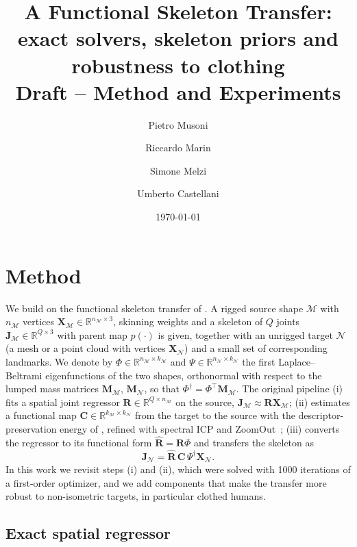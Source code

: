 \documentclass[11pt]{article}
\title{A Functional Skeleton Transfer: exact solvers, skeleton priors and robustness to clothing\\[0.3em]
\large Draft -- Method and Experiments}
\author{Pietro Musoni \and Riccardo Marin \and Simone Melzi \and Umberto Castellani}
\date{\today}
\newcommand{\M}{\mathcal{M}}
\newcommand{\N}{\mathcal{N}}
\newcommand{\R}{\mathbb{R}}
\newcommand{\Rspat}{\mathbf{R}}
\newcommand{\Rhat}{\widehat{\mathbf{R}}}
\newcommand{\X}{\mathbf{X}}
\newcommand{\J}{\mathbf{J}}
\newcommand{\C}{\mathbf{C}}
\begin{document}
\maketitle

\section{Method}
\label{sec:method}

We build on the functional skeleton transfer of \citet{musoni2021functional}.
A rigged source shape $\M$ with $n_\M$ vertices $\X_\M \in \R^{n_\M \times 3}$,
skinning weights and a skeleton of $Q$ joints $\J_\M \in \R^{Q \times 3}$ with
parent map $p(\cdot)$ is given, together with an unrigged target $\N$ (a mesh or
a point cloud with vertices $\X_\N$) and a small set of corresponding landmarks.
We denote by $\Phi \in \R^{n_\M \times k_\M}$ and $\Psi \in \R^{n_\N \times k_\N}$
the first Laplace--Beltrami eigenfunctions of the two shapes, orthonormal with
respect to the lumped mass matrices $\mathbf{M}_\M$, $\mathbf{M}_\N$, so that
$\Phi^\dagger = \Phi^\top \mathbf{M}_\M$. The original pipeline
(i) fits a spatial joint regressor $\Rspat \in \R^{Q \times n_\M}$ on the
source, $\J_\M \approx \Rspat \X_\M$; (ii) estimates a functional map
$\C \in \R^{k_\M \times k_\N}$ from the target to the source with the
descriptor-preservation energy of \citet{nogneng2017informative}, refined with
spectral ICP and ZoomOut~\citep{melzi2019zoomout}; (iii) converts the regressor
to its functional form $\Rhat = \Rspat \Phi$ and transfers the skeleton as
\begin{equation}
  \J_\N = \Rhat \, \C \, \Psi^\dagger \X_\N .
  \label{eq:transfer}
\end{equation}
In this work we revisit steps (i) and (ii), which were solved with 1000
iterations of a first-order optimizer, and we add components that make the
transfer more robust to non-isometric targets, in particular clothed humans.

\subsection{Exact spatial regressor}
\label{sec:regressor}
\end{document}
